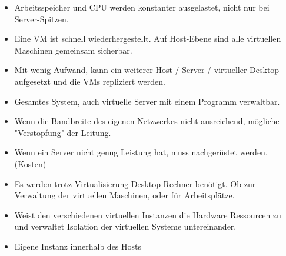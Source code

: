 \documentclass[10pt,a4paper,ragged2e]{altacv}
\begin{document}
\begin{paracol}{2}

\begin{itemize}
\item Arbeitsspeicher und CPU werden konstanter ausgelastet, nicht nur bei Server-Spitzen.
\item Eine VM ist schnell wiederhergestellt. \newline Auf Host-Ebene sind alle virtuellen Maschinen gemeinsam sicherbar.
\item Mit wenig Aufwand, kann ein weiterer Host \newline / Server / virtueller Desktop aufgesetzt und die VMs repliziert werden.  
\item Gesamtes System, auch virtuelle Server mit einem Programm verwaltbar.

\end{itemize}

\divider

\begin{itemize}
\item Wenn die Bandbreite des eigenen Netzwerkes nicht ausreichend, mögliche "Verstopfung" der Leitung.
\item Wenn ein Server nicht genug Leistung hat, \newline muss nachgerüstet werden. (Kosten)
\item Es werden trotz Virtualisierung Desktop-Rechner benötigt. Ob zur Verwaltung der virtuellen Maschinen, oder für Arbeitsplätze.

\end{itemize}


\begin{itemize}
\item Weist den verschiedenen virtuellen Instanzen die Hardware Ressourcen zu und verwaltet Isolation der virtuellen Systeme untereinander.
\end{itemize}

\vspace{3mm}

\begin{itemize}
    \item Eigene Instanz innerhalb des Hosts 
\end{itemize}


\end{paracol}
\end{document}
